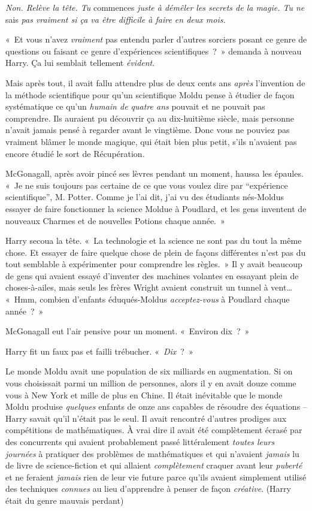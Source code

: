 \emph{Non. Relève la tête. Tu} commences \emph{juste à démêler les secrets de la magie. Tu ne} sais \emph{pas vraiment si ça va être difficile à faire en deux mois.}

«~Et vous n'avez \emph{vraiment} pas entendu parler d'autres sorciers posant ce genre de questions ou faisant ce genre d'expériences scientifiques~?~» demanda à nouveau Harry. Ça lui semblait tellement \emph{évident}.

Mais après tout, il avait fallu attendre plus de deux cents ans \emph{après} l'invention de la méthode scientifique pour qu'un scientifique Moldu pense à étudier de façon systématique ce qu'un \emph{humain de quatre ans} pouvait et ne pouvait pas comprendre. Ils auraient pu découvrir ça au dix-huitième siècle, mais personne n'avait jamais pensé à regarder avant le vingtième. Donc vous ne pouviez pas vraiment blâmer le monde magique, qui était bien plus petit, s'ils n'avaient pas encore étudié le sort de Récupération.

McGonagall, après avoir pincé ses lèvres pendant un moment, haussa les épaules. «~Je ne suis toujours pas certaine de ce que vous voulez dire par “expérience scientifique”, M. Potter. Comme je l'ai dit, j'ai vu des étudiants nés-Moldus essayer de faire fonctionner la science Moldue à Poudlard, et les gens inventent de nouveaux Charmes et de nouvelles Potions chaque année.~»

Harry secoua la tête. «~La technologie et la science ne sont pas du tout la même chose. Et essayer de faire quelque chose de plein de façons différentes n'est pas du tout semblable à expérimenter pour comprendre les règles.~» Il y avait beaucoup de gens qui avaient essayé d'inventer des machines volantes en essayant plein de choses-à-ailes, mais seuls les frères Wright avaient construit un tunnel à vent… «~Hmm, combien d'enfants éduqués-Moldus \emph{acceptez-vous} à Poudlard chaque année~?~»

McGonagall eut l'air pensive pour un moment. «~Environ dix~?~»

Harry fit un faux pas et failli trébucher. «~\emph{Dix}~?~»

Le monde Moldu avait une population de six milliards en augmentation. Si on vous choisissait parmi un million de personnes, alors il y en avait douze comme vous à New York et mille de plus en Chine. Il était inévitable que le monde Moldu produise \emph{quelques} enfants de onze ans capables de résoudre des équations -- Harry savait qu'il n'était pas le seul. Il avait rencontré d'autres prodiges aux compétitions de mathématiques. À vrai dire il avait été complètement écrasé par des concurrents qui avaient probablement passé littéralement \emph{toutes leurs journées} à pratiquer des problèmes de mathématiques et qui n'avaient \emph{jamais} lu de livre de science-fiction et qui allaient \emph{complètement} craquer avant leur \emph{puberté} et ne feraient \emph{jamais} rien de leur vie future parce qu'ils avaient simplement utilisé des techniques \emph{connues} au lieu d'apprendre à penser de façon \emph{créative}. (Harry était du genre mauvais perdant)

